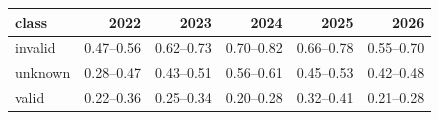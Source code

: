 \begin{tabular}{lrrrrr}
\toprule
class & 2022 & 2023 & 2024 & 2025 & 2026 \\
\midrule
invalid & 0.47--0.56 & 0.62--0.73 & 0.70--0.82 & 0.66--0.78 & 0.55--0.70 \\
unknown & 0.28--0.47 & 0.43--0.51 & 0.56--0.61 & 0.45--0.53 & 0.42--0.48 \\
valid & 0.22--0.36 & 0.25--0.34 & 0.20--0.28 & 0.32--0.41 & 0.21--0.28 \\
\bottomrule
\end{tabular}
